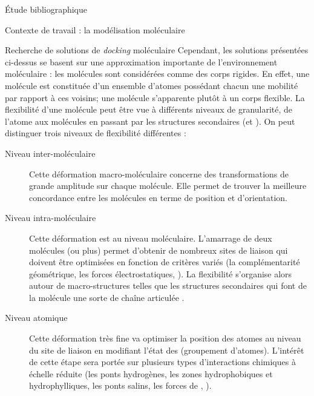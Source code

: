 \documentclass[myfrancais,ngerman,english,french]{mythesis}
\begin{document}
\begin{mychapter}{Étude bibliographique}
\begin{mysection}{Contexte de travail : la modélisation moléculaire}
\begin{mysubsection}{Recherche de solutions de \textit{docking} moléculaire}
				Cependant, les solutions présentées ci-dessus se basent sur une approximation importante de l'environnement moléculaire : les molécules sont considérées comme des corps rigides.
				En effet, une molécule est constituée d'un ensemble d'atomes possédant chacun une mobilité par rapport à ces voisins; une molécule s'apparente plutôt à un corps flexible.
				La flexibilité d'une molécule peut être vue à différents niveaux de granularité, de l'atome aux molécules en passant par les structures secondaires (\myhelice* et \myfeuillet*).
				On peut distinguer trois niveaux de flexibilité différentes :
				\begin{description}
					\item[Niveau inter-moléculaire] Cette déformation macro-moléculaire concerne des transformations de grande amplitude sur chaque molécule.
						Elle permet de trouver la meilleure concordance entre les molécules en terme de position et d'orientation.
					\item[Niveau intra-moléculaire] Cette déformation est au niveau moléculaire.
						L'amarrage de deux molécules (ou plus) permet d'obtenir de nombreux sites de liaison qui doivent être optimisées en fonction de critères variés (la complémentarité géométrique, les forces électrostatiques, \myetc).
						La flexibilité s'organise alors autour de macro-structures telles que les structures secondaires qui font de la molécule une sorte de chaîne articulée .
					\item[Niveau atomique] Cette déformation très fine va optimiser la position des atomes au niveau du site de liaison en modifiant l'état des  (groupement d'atomes).
						L'intérêt de cette étape sera portée sur plusieurs types d'interactions chimiques à échelle réduite (les ponts hydrogènes, les zones hydrophobiques et hydrophylliques, les ponts salins, les forces de  , \myetc).
				\end{description}

				\begin{myfigure}
				\end{myfigure}


\end{mysubsection}
\end{mysection}
\end{mychapter}
\end{document}
